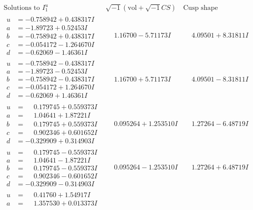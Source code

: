 \documentclass[1p]{elsarticle_modified}
\theoremstyle{definition}
\newcommand{\I}{\sqrt{-1}}
\begin{document}
$$\begin{array}{c|c|c}  
\text{Solutions to }I^u_{1}& \I (\text{vol} + \sqrt{-1}CS) & \text{Cusp shape}\\
 \hline 
\begin{aligned}
u &= -0.758942 + 0.438317 I \\
a &= -1.89723 + 0.52453 I \\
b &= -0.758942 + 0.438317 I \\
c &= -0.054172 - 1.264670 I \\
d &= -0.62069 - 1.46361 I\end{aligned}
 & \phantom{-}1.16700 - 5.71173 I & \phantom{-}4.09501 + 8.31811 I \\ \hline\begin{aligned}
u &= -0.758942 - 0.438317 I \\
a &= -1.89723 - 0.52453 I \\
b &= -0.758942 - 0.438317 I \\
c &= -0.054172 + 1.264670 I \\
d &= -0.62069 + 1.46361 I\end{aligned}
 & \phantom{-}1.16700 + 5.71173 I & \phantom{-}4.09501 - 8.31811 I \\ \hline\begin{aligned}
u &= \phantom{-}0.179745 + 0.559373 I \\
a &= \phantom{-}1.04641 + 1.87221 I \\
b &= \phantom{-}0.179745 + 0.559373 I \\
c &= \phantom{-}0.902346 + 0.601652 I \\
d &= -0.329909 + 0.314903 I\end{aligned}
 & \phantom{-}0.095264 + 1.253510 I & \phantom{-}1.27264 - 6.48719 I \\ \hline\begin{aligned}
u &= \phantom{-}0.179745 - 0.559373 I \\
a &= \phantom{-}1.04641 - 1.87221 I \\
b &= \phantom{-}0.179745 - 0.559373 I \\
c &= \phantom{-}0.902346 - 0.601652 I \\
d &= -0.329909 - 0.314903 I\end{aligned}
 & \phantom{-}0.095264 - 1.253510 I & \phantom{-}1.27264 + 6.48719 I \\ \hline\begin{aligned}
u &= \phantom{-}0.41760 + 1.54917 I \\
a &= \phantom{-}1.357530 + 0.013373 I \\

\end{aligned}
\end{array}$$
\end{document}
